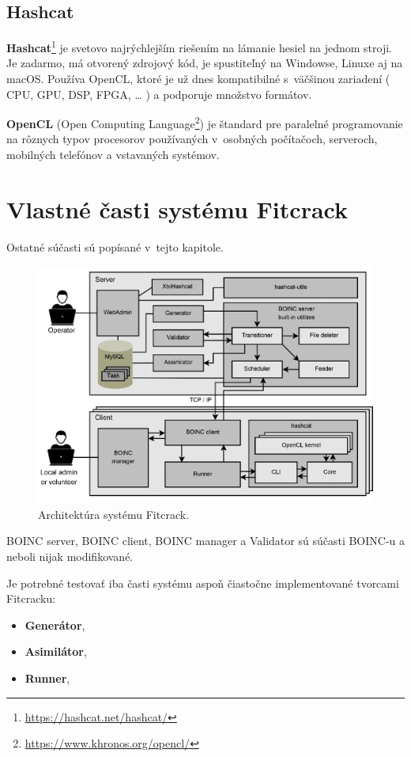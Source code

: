 \subsection{Hashcat}
\label{hashcat}
\textbf{Hashcat}\footnote{\url{https://hashcat.net/hashcat/}} je svetovo najrýchlejším riešením na lámanie hesiel na jednom stroji.
Je zadarmo, má otvorený zdrojový kód, je spustiteľný na Windowse, Linuxe aj na macOS.
Používa OpenCL, ktoré je už dnes kompatibilné s~väčšinou zariadení ( CPU, GPU, DSP, FPGA, … ) a podporuje množstvo formátov.

\textbf{OpenCL} (Open Computing Language\footnote{\url{https://www.khronos.org/opencl/}}) je štandard pre paralelné programovanie na rôznych typov procesorov používaných v~osobných počítačoch, serveroch, mobilných telefónov a vstavaných systémov.


\section{Vlastné časti systému Fitcrack}
\label{Fitcrack_casti}
Ostatné súčasti sú popísané v~tejto kapitole.
\begin{figure}[H]
\centering
\includegraphics[width=\textwidth]{obrazky/fc_arch-1.png}
\caption{Architektúra systému Fitcrack.~\cite{TR_TARZAN}}
\label{fig:fc_arch}
\end{figure}

BOINC server, BOINC client, BOINC manager a Validator sú súčasti BOINC-u a neboli nijak modifikované.

Je potrebné testovať iba časti systému aspoň čiastočne implementované tvorcami Fitcracku:
\begin{itemize}
	\label{tests_moduls}
	\item \textbf{Generátor},
	\item \textbf{Asimilátor},
	\item \textbf{Runner},
\end{itemize}

